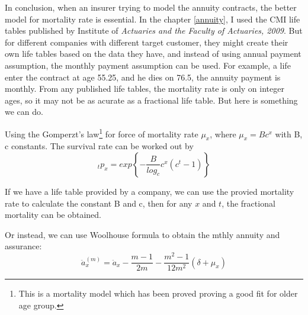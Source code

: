 \documentclass{report}
\begin{document}
In conclusion, when an insurer trying to model the annuity contracts, the better model for mortality rate is essential. In the chapter \ref{annuity}, I used the CMI life tables published by Institute of {\em Actuaries and the Faculty of Actuaries, 2009}. But for different companies with different target customer, they might create their own life tables based on the data they have, and instead of using annual payment assumption, the monthly payment assumption can be used. For example, a life enter the contract at age 55.25, and he dies on 76.5, the annuity payment is monthly. From any published life tables, the mortality rate is only on integer ages, so it may not be as acurate as a fractional life table. But here is something we can do.

Using the Gomperzt's law\footnote{ This is a mortality model which has been proved proving a good fit for older age group.} for force of mortality rate $\mu_x$, where $\mu_x=Bc^x$ with B, c constants. The survival rate can be worked out by
\[
_tp_x = exp \left\{ -\frac{B}{log_c} c^x (c^t-1) \right\}
\]

If we have a life table provided by a company, we can use the provied mortality rate to calculate the constant B and c, then for any $x$ and $t$, the fractional mortality can be obtained.

Or instead, we can use Woolhouse formula to obtain the mthly annuity and assurance:
\[
\ddot{a}_x^(m) = \ddot{a}_x  -\frac{m-1}{2m}-\frac{m^2-1}{12m^2}(	\delta +\mu_x)
\]
\end{document}
